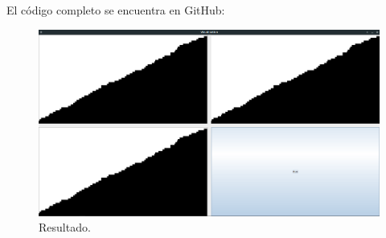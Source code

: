 \documentclass[paper=a4, fontsize=11pt]{scrartcl} %
\numberwithin{equation}{section} %
\numberwithin{figure}{section} %
\numberwithin{table}{section} %
\begin{document}
El código completo se encuentra en GitHub:

\begin{figure}
    \includegraphics[width=\linewidth]{Resultado.png}
    \caption{Resultado.}
\end{figure}


\end{document}
